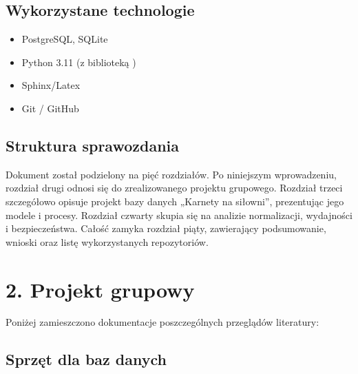 \documentclass[letterpaper,10pt,polish]{sphinxmanual}
\begin{document}
\section{Wykorzystane technologie}
\label{\detokenize{rozdzial1/rozdzial1:wykorzystane-technologie}}\begin{itemize}
\item {} 
\sphinxAtStartPar
{} PostgreSQL, SQLite

\item {} 
\sphinxAtStartPar
{} Python 3.11 (z biblioteką )

\item {} 
\sphinxAtStartPar
{} Sphinx/Latex

\item {} 
\sphinxAtStartPar
{} Git / GitHub

\end{itemize}


\section{Struktura sprawozdania}
\label{\detokenize{rozdzial1/rozdzial1:struktura-sprawozdania}}
\sphinxAtStartPar
Dokument został podzielony na pięć rozdziałów. Po niniejszym wprowadzeniu, rozdział drugi odnosi się do zrealizowanego projektu grupowego. Rozdział trzeci szczegółowo opisuje projekt bazy danych „Karnety na siłowni”, prezentując jego modele i procesy. Rozdział czwarty skupia się na analizie normalizacji, wydajności i bezpieczeństwa. Całość zamyka rozdział piąty, zawierający podsumowanie, wnioski oraz listę wykorzystanych repozytoriów.

\sphinxstepscope


\chapter{2. Projekt grupowy}
\label{\detokenize{rozdzial2/rozdzial2:projekt-grupowy}}\label{\detokenize{rozdzial2/rozdzial2::doc}}
\sphinxAtStartPar
Poniżej zamieszczono dokumentacje poszczególnych przeglądów literatury:

\sphinxstepscope


\section{Sprzęt dla baz danych}
\label{\detokenize{rozdzial2/Sprzet-dla-bazy-danych/source/SprzetDlaBazyDanych:sprzet-dla-baz-danych}}\label{\detokenize{rozdzial2/Sprzet-dla-bazy-danych/source/SprzetDlaBazyDanych::doc}}
\end{document}
